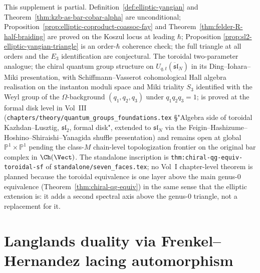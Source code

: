 \begin{remark}
\label{rem:elliptic-supplement-scope}
This supplement is partial. Definition~\ref{def:elliptic-yangian}
and Theorem~\ref{thm:kzb-as-bar-cobar-alpha} are unconditional;
Proposition~\ref{prop:elliptic-coproduct-coassoc-fay} and
Theorem~\ref{thm:felder-R-half-braiding} are proved on the Koszul
locus at leading $\hbar$; Proposition
\ref{prop:sl2-elliptic-yangian-triangle} is an order-$\hbar$
coherence check; the full triangle at all orders and the $E_3$
identification are conjectural. The toroidal two-parameter
analogue; the chiral quantum group structure on
$U_{q,t}(\ddot{\mathfrak{sl}}_N)$ in its Ding--Iohara--Miki presentation,
with Schiffmann--Vasserot cohomological Hall algebra realisation on the
instanton moduli space and Miki triality $S_3$ identified with the
Weyl group of the $\Omega$-background $(q_1, q_2, q_3)$ under
$q_1 q_2 q_3 = 1$; is proved at the formal disk level in
Vol~III (\texttt{chapters/theory/quantum\_groups\_foundations.tex}
\S "Algebra side of toroidal Kazhdan--Lusztig, $\mathfrak{sl}_2$,
formal disk", extended to $\mathfrak{sl}_N$ via the
Feigin--Hashizume--Hoshino--Shiraishi--Yanagida shuffle
presentation) and remains open at global
$\mathbb{P}^1 \times \mathbb{P}^1$ pending the class-$M$
chain-level topologization frontier on the original bar complex
in $\Ch(\Vect)$. The standalone inscription is
\texttt{thm:chiral-qg-equiv-toroidal-sf} of
\texttt{standalone/seven\_faces.tex}; no Vol~I chapter-level
theorem is planned because the toroidal equivalence is one
layer above the main genus-$0$ equivalence
(Theorem~\ref{thm:chiral-qg-equiv}) in the same sense that the
elliptic extension is: it adds a second spectral axis above the
genus-$0$ triangle, not a replacement for it.
\end{remark}

\section{Langlands duality via Frenkel--Hernandez lacing automorphism}
\label{sec:yangian-langlands-lacing}

